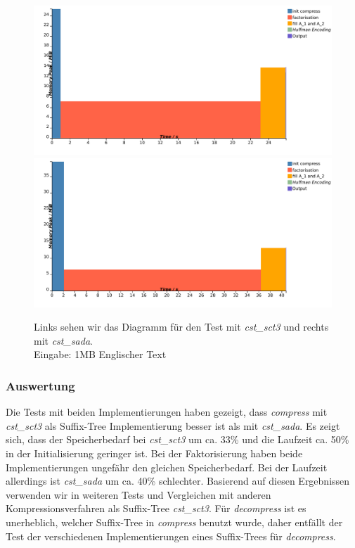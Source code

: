\documentclass[a4paper,11pt]{scrartcl}%
\theoremstyle{change}
\theoremstyle{nonumberplain}
\theoremstyle{change}
\theoremstyle{nonumberplain}
\theoremstyle{change}
\theoremstyle{nonumberplain}
\begin{document}
\begin{figure}[h]
	\includegraphics[scale=0.31]{./pics/1MB_english_sct3}
	\includegraphics[scale=0.31]{./pics/1MB_english_sada}
	\caption{Links sehen wir das Diagramm für den Test mit \textit{cst\_sct3} und rechts mit \textit{cst\_sada}.\\ Eingabe: 1MB Englischer Text}
	\label{fig:suffix_trees_test_english}
\end{figure}

\subsubsection{Auswertung}

Die Tests mit beiden Implementierungen haben gezeigt, dass \textit{compress} mit \textit{cst\_sct3} als Suffix-Tree Implementierung besser ist als mit \textit{cst\_sada}. Es zeigt sich, dass der Speicherbedarf bei \textit{cst\_sct3} um ca. 33\% und die Laufzeit ca. 50\% in der Initialisierung geringer ist. Bei der Faktorisierung haben beide Implementierungen ungefähr den gleichen Speicherbedarf. Bei der Laufzeit allerdings ist \textit{cst\_sada} um ca. 40\% schlechter. 
\newline
Basierend auf diesen Ergebnissen verwenden wir in weiteren Tests und Vergleichen mit anderen Kompressionsverfahren als Suffix-Tree \textit{cst\_sct3}.
\newline
Für \textit{decompress} ist es unerheblich, welcher Suffix-Tree in \textit{compress} benutzt wurde, daher entfällt der Test der verschiedenen Implementierungen eines Suffix-Trees für \textit{decompress}.
\end{document}

